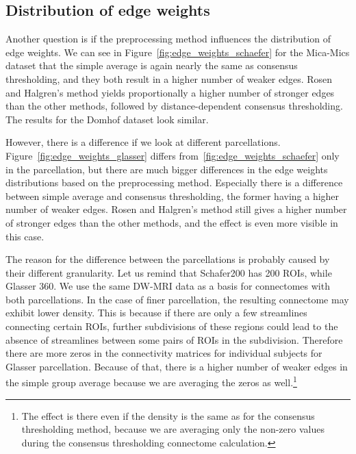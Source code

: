 \subsection{Distribution of edge weights}

Another question is if the preprocessing method influences the distribution of edge weights. We can see in Figure~\ref{fig:edge_weights_schaefer} for the Mica-Mics dataset that the simple average is again nearly the same as consensus thresholding, and they both result in a higher number of weaker edges. Rosen and Halgren's method yields proportionally a higher number of stronger edges than the other methods, followed by distance-dependent consensus thresholding. The results for the Domhof dataset look similar.

However, there is a difference if we look at different parcellations. Figure~\ref{fig:edge_weights_glasser} differs from~\ref{fig:edge_weights_schaefer} only in the parcellation, but there are much bigger differences in the edge weights distributions based on the preprocessing method. Especially there is a difference between simple average and consensus thresholding, the former having a higher number of weaker edges. Rosen and Halgren's method still gives a higher number of stronger edges than the other methods, and the effect is even more visible in this case.

The reason for the difference between the parcellations is probably caused by their different granularity. Let us remind that Schafer200 has 200 ROIs, while Glasser 360. We use the same DW-MRI data as a basis for connectomes with both parcellations. In the case of finer parcellation, the resulting connectome may exhibit lower density. This is because if there are only a few streamlines connecting certain ROIs, further subdivisions of these regions could lead to the absence of streamlines between some pairs of ROIs in the subdivision. Therefore there are more zeros in the connectivity matrices for individual subjects for Glasser parcellation. Because of that, there is a higher number of weaker edges in the simple group average because we are averaging the zeros as well.\footnote{The effect is there even if the density is the same as for the consensus thresholding method, because we are averaging only the non-zero values during the consensus thresholding connectome calculation.}

